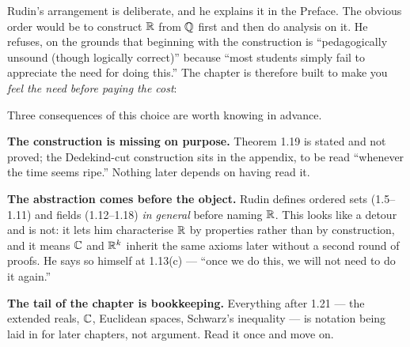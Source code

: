 \documentclass[11pt,twoside]{article}
\begin{document}
\begin{roadmap}
Rudin's arrangement is deliberate, and he explains it in the Preface. The
obvious order would be to construct $\mathbb{R}$ from $\mathbb{Q}$ first and then do analysis on
it. He refuses, on the grounds that beginning with the construction is
``pedagogically unsound (though logically correct)'' because ``most students
simply fail to appreciate the need for doing this.'' The chapter is therefore
built to make you \emph{feel the need before paying the cost}:

\medskip
\centering
{}

\medskip
\raggedright
Three consequences of this choice are worth knowing in advance.

\smallskip
\textbf{The construction is missing on purpose.} Theorem 1.19 is stated and not
proved; the Dedekind-cut construction sits in the appendix, to be read ``whenever
the time seems ripe.'' Nothing later depends on having read it.

\smallskip
\textbf{The abstraction comes before the object.} Rudin defines ordered sets
(1.5--1.11) and fields (1.12--1.18) \emph{in general} before naming $\mathbb{R}$. This
looks like a detour and is not: it lets him characterise $\mathbb{R}$ by properties
rather than by construction, and it means $\mathbb{C}$ and $\mathbb{R}^k$ inherit the same
axioms later without a second round of proofs. He says so himself at 1.13(c) ---
``once we do this, we will not need to do it again.''

\smallskip
\textbf{The tail of the chapter is bookkeeping.} Everything after 1.21 --- the
extended reals, $\mathbb{C}$, Euclidean spaces, Schwarz's inequality --- is notation
being laid in for later chapters, not argument. Read it once and move on.
\end{roadmap}
\end{document}
